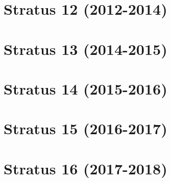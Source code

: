\documentclass[12pt]{report}
\newcommand{\imagepath}{/Users/yugao/UOP/ORS-processing/img}
\begin{document}
\chapter{Stratus 12 (2012-2014)}


\providecommand{\projectname}{}
\providecommand{\displayprojectname}{}
\providecommand{\caseyear}{}
\providecommand{\casenumber}{}
\providecommand{\previouscasenumber}{}
\providecommand{\imagepath}{}
\providecommand{\HasNextDeploymentOverlap}{}
\providecommand{\FirstInstrumentType}{}
\providecommand{\SecondInstrumentType}{}
\providecommand{\DeploymentSpike}{}
\providecommand{\DeploymentRecordedSpike}{}
\providecommand{\RecoverySpike}{}
\providecommand{\RecoveryRecordedSpike}{}
\providecommand{\FirstInstrument}{}
\providecommand{\SecondInstrument}{}
\providecommand{\PreviousDeploymentInstrument}{}
\providecommand{\CurrentDeploymentInstrument}{}
\providecommand{\pressureavailable}{}
\providecommand{\pressurenote}{}
\providecommand{\MeanDiffTemp}{}
\providecommand{\StdDiffTemp}{}
\providecommand{\StdSingleTemp}{}
\providecommand{\MeanDiffCond}{}
\providecommand{\StdDiffCond}{}
\providecommand{\StdSingleCond}{}
\providecommand{\MeanDiffPSal}{}
\providecommand{\StdDiffPSal}{}
\providecommand{\StdSinglePSal}{}
\providecommand{\MeanDiffASal}{}
\providecommand{\StdDiffASal}{}
\providecommand{\StdSingleASal}{}
\providecommand{\MeanDiffPres}{}
\providecommand{\StdDiffPres}{}
\providecommand{\StdSinglePres}{}
\providecommand{\WindowSize}{}
\providecommand{\ThresholdValue}{}

\chapter{Stratus 13 (2014-2015)}



\chapter{Stratus 14 (2015-2016)}



\chapter{Stratus 15 (2016-2017)}



\chapter{Stratus 16 (2017-2018)}


\end{document}
